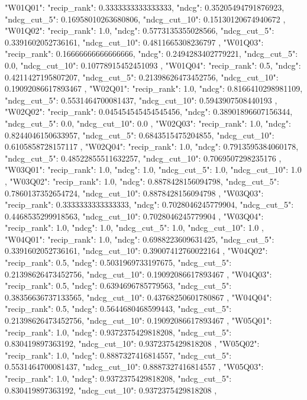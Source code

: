 {
 "W01Q01": {
  "recip_rank": 0.3333333333333333,
  "ndcg": 0.35205494791876923,
  "ndcg_cut_5": 0.16958010263680806,
  "ndcg_cut_10": 0.15130120674940672
 },
 "W01Q02": {
  "recip_rank": 1.0,
  "ndcg": 0.5773135355028566,
  "ndcg_cut_5": 0.3391602052736161,
  "ndcg_cut_10": 0.4811665308236797
 },
 "W01Q03": {
  "recip_rank": 0.16666666666666666,
  "ndcg": 0.2494283402779221,
  "ndcg_cut_5": 0.0,
  "ndcg_cut_10": 0.10778915452451093
 },
 "W01Q04": {
  "recip_rank": 0.5,
  "ndcg": 0.4211427195807207,
  "ndcg_cut_5": 0.21398626473452756,
  "ndcg_cut_10": 0.19092086617893467
 },
 "W02Q01": {
  "recip_rank": 1.0,
  "ndcg": 0.8166410298981109,
  "ndcg_cut_5": 0.5531464700081437,
  "ndcg_cut_10": 0.5943907508440193
 },
 "W02Q02": {
  "recip_rank": 0.045454545454545456,
  "ndcg": 0.38901896607156344,
  "ndcg_cut_5": 0.0,
  "ndcg_cut_10": 0.0
 },
 "W02Q03": {
  "recip_rank": 1.0,
  "ndcg": 0.8244046150633957,
  "ndcg_cut_5": 0.6843515475204855,
  "ndcg_cut_10": 0.6105858728157117
 },
 "W02Q04": {
  "recip_rank": 1.0,
  "ndcg": 0.7913595384060178,
  "ndcg_cut_5": 0.48522855511632257,
  "ndcg_cut_10": 0.7069507298235176
 },
 "W03Q01": {
  "recip_rank": 1.0,
  "ndcg": 1.0,
  "ndcg_cut_5": 1.0,
  "ndcg_cut_10": 1.0
 },
 "W03Q02": {
  "recip_rank": 1.0,
  "ndcg": 0.8878428156094798,
  "ndcg_cut_5": 0.7860137352654724,
  "ndcg_cut_10": 0.8878428156094798
 },
 "W03Q03": {
  "recip_rank": 0.3333333333333333,
  "ndcg": 0.7028046245779904,
  "ndcg_cut_5": 0.4468535299918563,
  "ndcg_cut_10": 0.7028046245779904
 },
 "W03Q04": {
  "recip_rank": 1.0,
  "ndcg": 1.0,
  "ndcg_cut_5": 1.0,
  "ndcg_cut_10": 1.0
 },
 "W04Q01": {
  "recip_rank": 1.0,
  "ndcg": 0.6988223609631425,
  "ndcg_cut_5": 0.3391602052736161,
  "ndcg_cut_10": 0.39007412760022164
 },
 "W04Q02": {
  "recip_rank": 0.5,
  "ndcg": 0.5031969733197675,
  "ndcg_cut_5": 0.21398626473452756,
  "ndcg_cut_10": 0.19092086617893467
 },
 "W04Q03": {
  "recip_rank": 0.5,
  "ndcg": 0.6394696785779563,
  "ndcg_cut_5": 0.38356636737133565,
  "ndcg_cut_10": 0.43768250601780867
 },
 "W04Q04": {
  "recip_rank": 0.5,
  "ndcg": 0.5644680468599443,
  "ndcg_cut_5": 0.21398626473452756,
  "ndcg_cut_10": 0.19092086617893467
 },
 "W05Q01": {
  "recip_rank": 1.0,
  "ndcg": 0.9372375429818208,
  "ndcg_cut_5": 0.830419897363192,
  "ndcg_cut_10": 0.9372375429818208
 },
 "W05Q02": {
  "recip_rank": 1.0,
  "ndcg": 0.8887327416814557,
  "ndcg_cut_5": 0.5531464700081437,
  "ndcg_cut_10": 0.8887327416814557
 },
 "W05Q03": {
  "recip_rank": 1.0,
  "ndcg": 0.9372375429818208,
  "ndcg_cut_5": 0.830419897363192,
  "ndcg_cut_10": 0.9372375429818208
 },
}
